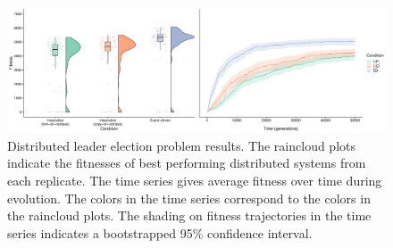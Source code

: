 \begin{figure}[h]
  \includegraphics[width=\columnwidth]{chapters/04-evolving-event-driven-programs-with-signalgp/media/election-fitness.pdf}
  \caption{\small 
  Distributed leader election problem results. 
  The raincloud plots indicate the fitnesses of best performing distributed systems from each replicate. 
  The time series gives average fitness over time during evolution. 
  The colors in the time series correspond to the colors in the raincloud plots. 
  The shading on fitness trajectories in the time series indicates a bootstrapped 95\% confidence interval.
  }
  \label{chapter:signalgp:fig:election-fitness}
\end{figure}